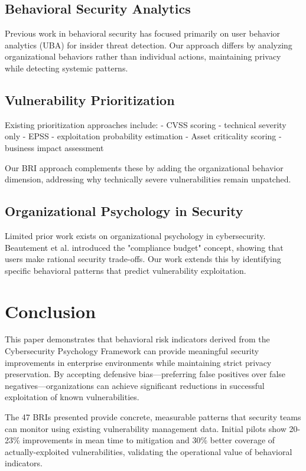 \documentclass[11pt,a4paper]{article}
\begin{document}
\subsection{Behavioral Security Analytics}

Previous work in behavioral security has focused primarily on user behavior analytics (UBA) for insider threat detection\cite{salem2008}. Our approach differs by analyzing organizational behaviors rather than individual actions, maintaining privacy while detecting systemic patterns.

\subsection{Vulnerability Prioritization}

Existing prioritization approaches include:
- CVSS scoring\cite{mell2007} - technical severity only
- EPSS\cite{epss2021} - exploitation probability estimation
- Asset criticality scoring - business impact assessment

Our BRI approach complements these by adding the organizational behavior dimension, addressing why technically severe vulnerabilities remain unpatched.

\subsection{Organizational Psychology in Security}

Limited prior work exists on organizational psychology in cybersecurity. Beautement et al.\cite{beautement2008} introduced the "compliance budget" concept, showing that users make rational security trade-offs. Our work extends this by identifying specific behavioral patterns that predict vulnerability exploitation.

\section{Conclusion}

This paper demonstrates that behavioral risk indicators derived from the Cybersecurity Psychology Framework can provide meaningful security improvements in enterprise environments while maintaining strict privacy preservation. By accepting defensive bias—preferring false positives over false negatives—organizations can achieve significant reductions in successful exploitation of known vulnerabilities.

The 47 BRIs presented provide concrete, measurable patterns that security teams can monitor using existing vulnerability management data. Initial pilots show 20-23\% improvements in mean time to mitigation and 30\% better coverage of actually-exploited vulnerabilities, validating the operational value of behavioral indicators.
\end{document}
